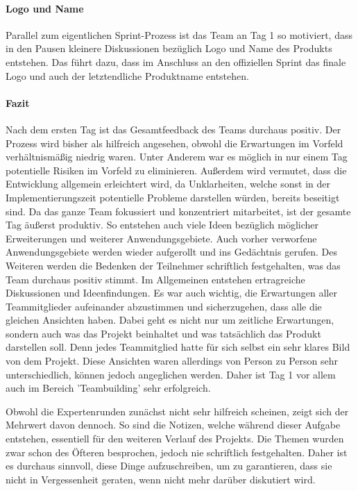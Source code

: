 \paragraph{Logo und Name}
Parallel zum eigentlichen Sprint-Prozess ist das Team an Tag 1 so motiviert, dass in den Pausen kleinere Diskussionen bezüglich Logo und Name des Produkts entstehen. Das führt dazu, dass im Anschluss an den offiziellen Sprint das finale Logo und auch der letztendliche Produktname entstehen.

\paragraph{Fazit}
Nach dem ersten Tag ist das Gesamtfeedback des Teams durchaus positiv. Der Prozess wird bisher als hilfreich angesehen, obwohl die Erwartungen im Vorfeld verhältnismäßig niedrig waren. Unter Anderem war es möglich in nur einem Tag potentielle Risiken im Vorfeld zu eliminieren. Außerdem wird vermutet, dass die Entwicklung allgemein erleichtert wird, da Unklarheiten, welche sonst in der Implementierungszeit potentielle Probleme darstellen würden, bereits beseitigt sind. Da das ganze Team fokussiert und konzentriert mitarbeitet, ist der gesamte Tag äußerst produktiv. So entstehen auch viele Ideen bezüglich möglicher Erweiterungen und weiterer Anwendungsgebiete. Auch vorher verworfene Anwendungsgebiete werden wieder aufgerollt und ins Gedächtnis gerufen. Des Weiteren werden die Bedenken der Teilnehmer schriftlich festgehalten, was das Team durchaus positiv stimmt. Im Allgemeinen entstehen ertragreiche Diskussionen und Ideenfindungen. Es war auch wichtig, die Erwartungen aller Teammitglieder aufeinander abzustimmen und sicherzugehen, dass alle die gleichen Ansichten haben. Dabei geht es nicht nur um zeitliche Erwartungen, sondern auch was das Projekt beinhaltet und was tatsächlich das Produkt darstellen soll. Denn jedes Teammitglied hatte für sich selbst ein sehr klares Bild von dem Projekt. Diese Ansichten waren allerdings von Person zu Person sehr unterschiedlich, können jedoch angeglichen werden. Daher ist Tag 1 vor allem auch im Bereich 'Teambuilding' sehr erfolgreich.

Obwohl die Expertenrunden zunächst nicht sehr hilfreich scheinen, zeigt sich der Mehrwert davon dennoch. So sind die Notizen, welche während dieser Aufgabe entstehen, essentiell für den weiteren Verlauf des Projekts. Die Themen wurden zwar schon des Öfteren besprochen, jedoch nie schriftlich festgehalten. Daher ist es durchaus sinnvoll, diese Dinge aufzuschreiben, um zu garantieren, dass sie nicht in Vergessenheit geraten, wenn nicht mehr darüber diskutiert wird.

